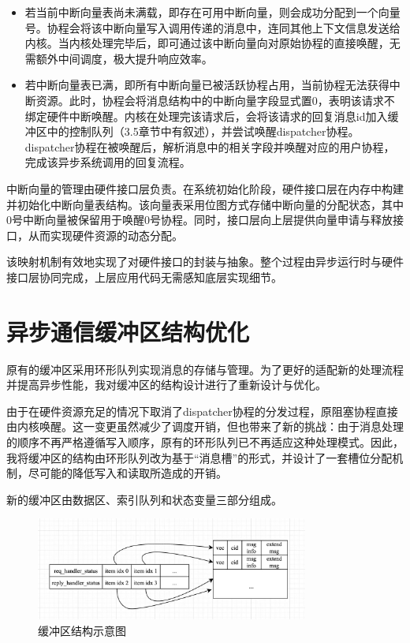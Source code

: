 \begin{itemize}
  \item 若当前中断向量表尚未满载，即存在可用中断向量，则会成功分配到一个向量号。协程会将该中断向量写入调用传递的消息中，连同其他上下文信息发送给内核。当内核处理完毕后，即可通过该中断向量向对原始协程的直接唤醒，无需额外中间调度，极大提升响应效率。

  \item 若中断向量表已满，即所有中断向量已被活跃协程占用，当前协程无法获得中断资源。此时，协程会将消息结构中的中断向量字段显式置0，表明该请求不绑定硬件中断唤醒。内核在处理完该请求后，会将该请求的回复消息id加入缓冲区中的控制队列（3.5章节中有叙述），并尝试唤醒dispatcher协程。dispatcher协程在被唤醒后，解析消息中的相关字段并唤醒对应的用户协程，完成该异步系统调用的回复流程。
\end{itemize}

中断向量的管理由硬件接口层负责。在系统初始化阶段，硬件接口层在内存中构建并初始化中断向量表结构。该向量表采用位图方式存储中断向量的分配状态，其中0号中断向量被保留用于唤醒0号协程。同时，接口层向上层提供向量申请与释放接口，从而实现硬件资源的动态分配。

该映射机制有效地实现了对硬件接口的封装与抽象。整个过程由异步运行时与硬件接口层协同完成，上层应用代码无需感知底层实现细节。

\section{异步通信缓冲区结构优化}\label{sec:buffer}

原有的缓冲区采用环形队列实现消息的存储与管理。为了更好的适配新的处理流程并提高异步性能，我对缓冲区的结构设计进行了重新设计与优化。

由于在硬件资源充足的情况下取消了dispatcher协程的分发过程，原阻塞协程直接由内核唤醒。这一变更虽然减少了调度开销，但也带来了新的挑战：由于消息处理的顺序不再严格遵循写入顺序，原有的环形队列已不再适应这种处理模式。因此，我将缓冲区的结构由环形队列改为基于“消息槽”的形式，并设计了一套槽位分配机制，尽可能的降低写入和读取所造成的开销。

新的缓冲区由数据区、索引队列和状态变量三部分组成。

\begin{figure}[htbp]
  \centering
  \includegraphics[width=0.8\textwidth]{images/buffer_structure.jpg}
  \caption{缓冲区结构示意图}\label{缓冲区结构示意图}
\end{figure}

